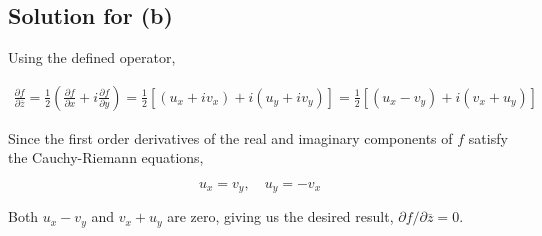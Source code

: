 \documentclass{scrartcl}
\begin{document}
\subsection{Solution for (b)}
Using the defined operator,

\begin{align*}
  \frac{\partial f}{\partial \overline{z}} = \frac{1}{2}\left( \frac{\partial f}{\partial x} + i \frac{\partial f}{\partial y} \right) = \frac{1}{2}\left[ (u_x + iv_x) + i(u_y + iv_y) \right] = \frac{1}{2}\left[ (u_x - v_y) + i(v_x + u_y) \right]
\end{align*}

Since the first order derivatives of the real and imaginary components of \(f\) satisfy the Cauchy-Riemann equations,

\[
  u_x = v_y, \quad u_y = -v_x
\]

Both \(u_x - v_y\) and \(v_x + u_y\) are zero, giving us the desired result, \(\partial f / \partial \overline{z} = 0\).
\end{document}
